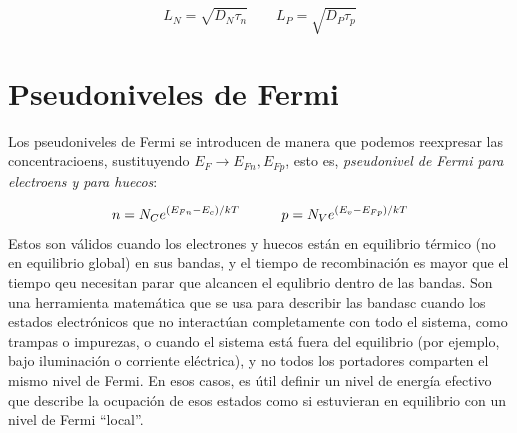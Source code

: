 \begin{equation}
	L_N = \sqrt{D_N \tau_n} \qquad  L_P = \sqrt{D_P \tau_p}
\end{equation}




\section{Pseudoniveles de Fermi}

Los pseudoniveles de Fermi se introducen de manera que podemos reexpresar las concentracioens, sustituyendo $E_F\rightarrow E_{Fn},E_{Fp}$, esto es, \textit{pseudonivel de Fermi para electroens y para huecos}:

\begin{equation}
	n=N_C e^{(E_{Fn}-E_c)/kT} \quad \quad \quad 
	p=N_V e^{(E_{v}-E_{Fp})/kT}
\end{equation}
Estos son válidos cuando los electrones y huecos están en equilibrio térmico (no en equilibrio global) en sus bandas, y el tiempo de recombinación es mayor que el tiempo qeu necesitan parar que alcancen el equlibrio dentro de las bandas. Son una herramienta matemática que se usa para describir las bandasc cuando los estados electrónicos que no interactúan completamente con todo el sistema, como trampas o impurezas, o cuando el sistema está fuera del equilibrio (por ejemplo, bajo iluminación o corriente eléctrica), y no todos los portadores comparten el mismo nivel de Fermi. En esos casos, es útil definir un nivel de energía efectivo que describe la ocupación de esos estados como si estuvieran en equilibrio con un nivel de Fermi ``local''.




